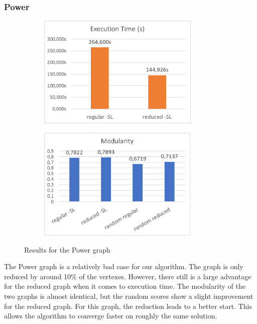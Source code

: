 \subsubsection{Power}
\begin{figure}[H]
\begin{center}
    \begin{subfigure}{0.47\textwidth}
    \begin{center}
    \includegraphics[height=5.4cm]{images/powertime.png}
    \end{center}
    \end{subfigure}
    \begin{subfigure}{0.47\textwidth}
    \begin{center}
    \includegraphics[height=5.4cm]{images/powerfitness.png}
    \end{center}
    \end{subfigure}
\caption{Results for the Power graph}\label{fig:power}
\end{center}
\end{figure}
The Power graph is a relatively bad case for our algorithm. The graph is only reduced by around 10\% of the vertexes. However, there still is a large advantage for the reduced graph when it comes to execution time. The modularity of the two graphs is almost identical, but the random scores show a slight improvement for the reduced graph. For this graph, the reduction leads to a better start. This allows the algorithm to converge faster on roughly the same solution.

